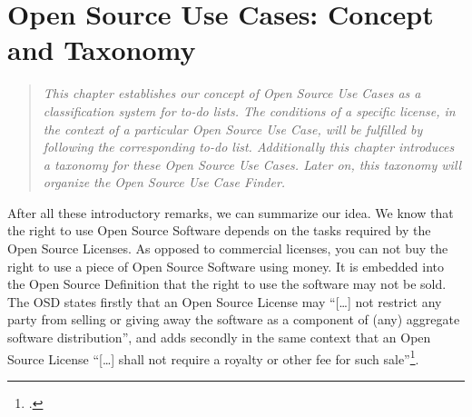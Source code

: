%
%
%
%
%



\chapter{Open Source Use Cases: Concept and Taxonomy}\label{sec:OSUCdeduction}

\footnotesize
\begin{quote}\itshape
This chapter establishes our concept of \emph{Open Source Use Cases} as a
classification system for to-do lists. The conditions of a specific license, in
the context of a par\-ti\-cu\-lar \emph{Open Source Use Case}, will be fulfilled
by following the corresponding to-do list. Additionally this chapter introduces a
taxonomy for these \emph{Open Source Use Cases}. Later on, this taxonomy will
organize the \emph{Open Source Use Case Finder}.
\end{quote}
\normalsize{}


After all these introductory remarks, we can summarize our idea. We know that
the right to use Open Source Software depends on the tasks required by the Open
Source Licenses. As opposed to commercial licenses, you can not buy the right to
use a piece of Open Source Software using money. It is embedded into the Open
Source Definition that the right to use the software may not be sold. The OSD
states firstly that an Open Source License may \enquote{[\ldots] not restrict any
party from selling or giving away the software as a component of (any) aggregate
software distribution}, and adds secondly in the same context that an Open
Source License \enquote{[\ldots] shall not require a royalty or other fee for such
sale}\footcite[cf.][\nopage wp. §1]{OSI2012a}.

